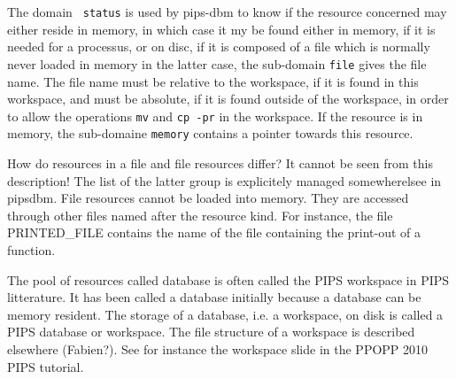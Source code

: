 \documentclass[a4paper]{article}
\begin{document}
{ The domain {\tt
    status} is used by pips-dbm to know if the resource concerned may
  either reside in memory, in which case it my be found either in
  memory, if it is needed for a processus, or on disc, if it is
  composed of a file which is normally never loaded in memory in the
  latter case, the sub-domain {\tt file} gives the file
  name.  The file name must be relative to the workspace, if it is
  found in this workspace, and must be absolute, if it is found
  outside of the workspace, in order to allow the operations
  \texttt{mv} and \texttt{cp -pr} in the workspace.  If the
  resource is in memory, the sub-domaine {\tt memory} contains a
  pointer towards this resource.
 
How do resources in a file and file resources differ? It cannot be seen
from this description! The list of the latter group is explicitely managed
somewherelsee in pipsdbm. File resources cannot be loaded into
memory. They are accessed through other files named after the resource
kind. For instance, the file PRINTED\_FILE contains the name of the
file containing the print-out of a function.

The pool of resources called database is often called the PIPS
workspace in PIPS litterature. It has been called a database initially
because a database can be memory resident.  The storage of a database,
i.e. a workspace, on disk is called a PIPS database or workspace. The
file structure of a workspace is described elsewhere (Fabien?). See
for instance the workspace slide in the PPOPP 2010 PIPS tutorial.  }
 
\end{document}
